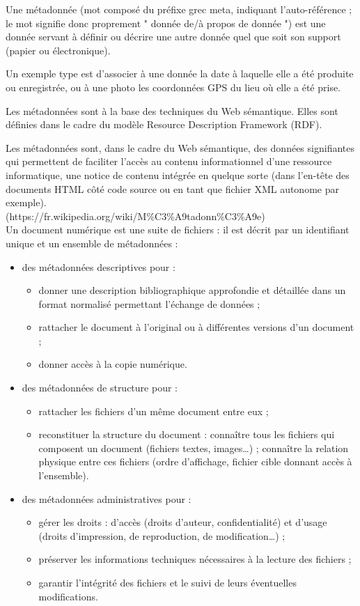 \documentclass[12pt]{report}
\begin{document}
Une métadonnée (mot composé du préfixe grec meta, indiquant l'auto-référence ; le mot signifie donc proprement " donnée de/à propos de donnée ") est une donnée servant à définir ou décrire une autre donnée quel que soit son support (papier ou électronique).

Un exemple type est d'associer à une donnée la date à laquelle elle a été produite ou enregistrée, ou à une photo les coordonnées GPS du lieu où elle a été prise.

Les métadonnées sont à la base des techniques du Web sémantique. Elles sont définies dans le cadre du modèle Resource Description Framework (RDF).

Les métadonnées sont, dans le cadre du Web sémantique, des données signifiantes qui permettent de faciliter l'accès au contenu informationnel d'une ressource informatique, une notice de contenu intégrée en quelque sorte (dans l'en-tête des documents HTML côté code source ou en tant que fichier XML autonome par exemple).
\\(https://fr.wikipedia.org/wiki/M\%C3\%A9tadonn\%C3\%A9e)\\

Un document numérique est une suite de fichiers : il est décrit par un identifiant unique et un ensemble de métadonnées :
\begin{itemize}
\item des métadonnées descriptives pour :
\begin{itemize}
\item donner une description bibliographique approfondie et détaillée dans un format normalisé permettant l’échange de données ;
\item rattacher le document à l’original ou à différentes versions d’un document ;
\item donner accès à la copie numérique.
\end{itemize}
\item des métadonnées de structure pour :
\begin{itemize}
\item rattacher les fichiers d’un même document entre eux ;
\item reconstituer la structure du document : connaître tous les fichiers qui composent un document (fichiers textes, images…) ; connaître la relation physique entre ces fichiers (ordre d’affichage, fichier cible donnant accès à l’ensemble).
\end{itemize}
\item des métadonnées administratives pour :
\begin{itemize}
\item gérer les droits : d’accès (droits d’auteur, confidentialité) et d’usage (droits d’impression, de reproduction, de modification…) ;
\item préserver les informations techniques nécessaires à la lecture des fichiers ;
\item garantir l’intégrité des fichiers et le suivi de leurs éventuelles modifications.
\end{itemize}
\end{itemize}
\end{document}
